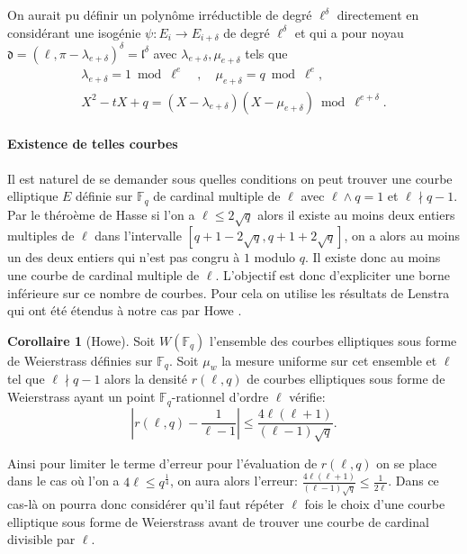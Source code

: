 \documentclass[10pt,a4paper]{book}
\theoremstyle{plain}
\theoremstyle{definition}
\theoremstyle{definition}
\newtheorem{cor}[thm]{Corollaire}
\theoremstyle{definition}
\theoremstyle{definition}
\theoremstyle{remark}
\theoremstyle{remark}
\begin{document}
On aurait pu définir un polynôme irréductible de degré $\ell^{\delta}$ directement en considérant une isogénie $\psi:E_i \to E_{i+\delta}$ de degré $\ell^{\delta}$ et qui a pour noyau $\mathfrak{d}=(\ell,\pi-\lambda_{e+\delta})^{\delta}=\mathfrak{l}^{\delta}$ avec $\lambda_{e+\delta}, \mu_{e+\delta}$ tels que 
\begin{align*}
\lambda_{e+\delta}=1 \bmod \ell^{e} \quad , \quad \mu_{e+\delta}=q \bmod \ell^e, \\
X^2-tX+q = (X-\lambda_{e+\delta})(X-\mu_{e+\delta}) \bmod \ell^{e+\delta} .
\end{align*}

\paragraph{Existence de telles courbes}
Il est naturel de se demander sous quelles conditions on peut trouver une courbe elliptique $E$ définie sur $\mathbb{F}_q$ de cardinal multiple de $\ell$ avec $\ell \wedge q =1$ et $\ell \nmid q-1$. Par le théroème de Hasse si l'on a $\ell \leqslant 2\sqrt{q}$ alors il existe au moins deux entiers multiples de $\ell$ dans l'intervalle $[q+1-2\sqrt{q}, q+1+2\sqrt{q} ] $, on a alors au moins un des deux entiers qui n'est pas congru à $1$ modulo $q$. Il existe donc au moins une courbe de cardinal multiple de $\ell$. L'objectif est donc d'expliciter une borne inférieure sur ce nombre de courbes. Pour cela on utilise les résultats de Lenstra \cite{lenstra1987} qui ont été étendus à notre cas par Howe \cite{howe1993}.

\begin{cor}[Howe]
\label{cor:Howe:densite}
Soit $W(\mathbb{F}_q)$ l'ensemble des courbes elliptiques sous forme de Weierstrass définies sur $\mathbb{F}_q$. Soit $\mu_w$ la mesure uniforme sur cet ensemble et $\ell$  tel que $\ell \nmid q-1$ alors la densité $r(\ell,q)$ de courbes elliptiques sous forme de Weierstrass ayant un point $\mathbb{F}_q$-rationnel d'ordre $\ell$ vérifie:
\begin{equation*}
|r(\ell,q)-\frac{1}{\ell-1}| \leqslant \frac{4\ell(\ell+1)}{(\ell-1)\sqrt{q}}.
\end{equation*}
\end{cor}
Ainsi pour limiter le terme d'erreur pour l'évaluation de $r(\ell,q)$ on se place dans le cas où l'on a $4\ell \leqslant q^{\frac{1}{4}}$, on aura alors l'erreur: $\frac{4\ell(\ell+1)}{(\ell-1)\sqrt{q}} \leqslant \frac{1}{2 \ell} $. Dans ce cas-là on pourra donc considérer qu'il faut répéter $\ell$ fois le choix d'une courbe elliptique sous forme de Weierstrass avant de trouver une courbe de cardinal divisible par $\ell$.
\end{document}
